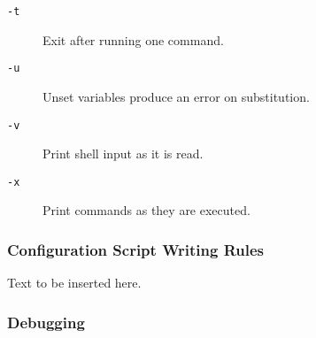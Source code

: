 \begin{description}
\item[{\tt -t}] \mbox{}

Exit after running one command. 

\item[{\tt -u}] \mbox{}

Unset variables produce an error on 
substitution. 

\item[{\tt -v}] \mbox{}

Print shell input as it is read. 

\item[{\tt -x}] \mbox{}

Print commands as they are executed. 

\end{description}





\subsubsection{Configuration Script Writing Rules}

Text to be inserted here.




\subsubsection{Debugging}



